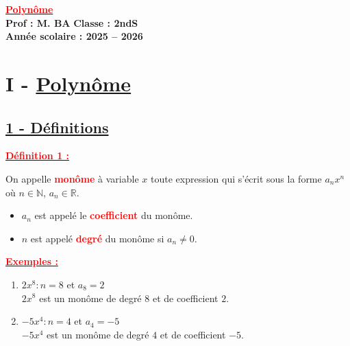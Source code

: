 \documentclass[12pt,a4paper]{article}
\begin{document}
\begin{center}
    \Large\textbf{\underline{\textcolor{red}{Polynôme}}}\\[-0.1cm]
    \normalsize\textbf{Prof : M. BA} \hfill \textbf{Classe : 2ndS}\\[-0.1cm]
    \textbf{Année scolaire : 2025 -- 2026}
\end{center}

\begin{center}
\end{center}

\vspace{1.5em}

\section*{%
    \color{red}I - \underline{Polynôme}%
}

\subsection*{%
    \color{red} \underline{1 - Définitions}%
}

\textbf{\underline{\textcolor{red}{Définition 1 :}}}

On appelle \textbf{\textcolor{red}{monôme}} à variable $x$ toute expression qui s'écrit sous la forme $a_n x^n$ où $n \in \mathbb{N}$, $a_n \in \mathbb{R}$.

\begin{itemize}
    \item $a_n$ est appelé le \textbf{\textcolor{red}{coefficient}} du monôme.
    \item $n$ est appelé \textbf{\textcolor{red}{degré}} du monôme si $a_n \neq 0$.
\end{itemize}

\textbf{\underline{\textcolor{red}{Exemples :}}}
\begin{enumerate}
    \item $2x^8 : n = 8$ et $a_8 = 2$ \\
    $2x^8$ est un monôme de degré $8$ et de coefficient $2$.
    
    \item $-5x^4 : n = 4$ et $a_4 = -5$ \\
    $-5x^4$ est un monôme de degré $4$ et de coefficient $-5$.
\end{enumerate}
\end{document}
